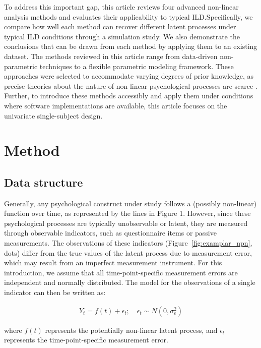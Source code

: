 \documentclass[man, floatsintext]{apa7}
\begin{document}
To address this important gap, this article reviews four advanced non-linear
analysis
methods and evaluates their applicability to typical ILD.\@ Specifically, we
compare how well each method can recover different latent processes under
typical ILD conditions through a simulation study. We also demonstrate the
conclusions that can be drawn from each method by applying them to an existing
dataset. The methods reviewed in this article range from data-driven
non-parametric techniques to a flexible parametric modeling framework. These
approaches were selected to accommodate varying degrees of prior knowledge, as
precise theories about the nature of non-linear psychological processes are
scarce \parencite{tan_time-varying_2011}. Further, to introduce these methods
accessibly and apply them under conditions where software implementations
are available, this article focuses on the univariate single-subject design.

\section{Method}

\subsection{Data structure}

Generally, any psychological construct under study follows a (possibly
non-linear) function over time, as represented by the lines in Figure 1.
However, since these psychological processes are typically unobservable or
latent, they are measured through observable indicators, such as questionnaire
items or passive measurements. The observations of these indicators
(Figure~\ref{fig:examplar_npn}, dots)
differ from the true values of the latent process due to measurement
error, which may result from an imperfect measurement instrument.
For this introduction, we assume that all time-point-specific measurement
errors are independent and normally distributed. The model for the
observations of a single indicator can then be written as:

\begin{align}
  Y_t = f(t) + \epsilon_t; \quad \epsilon_t \sim N(0, \sigma^2_{\epsilon})
\end{align}

\noindent where $f(t)$ represents the potentially non-linear latent process,
and $\epsilon_t$ represents the time-point-specific measurement error.
\end{document}

